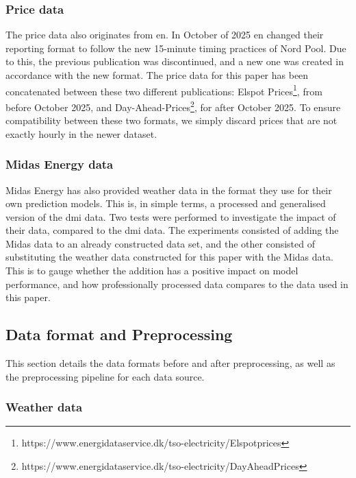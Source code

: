 \subsubsection{Price data}
The price data also originates from \gls{en}. In October of 2025 \gls{en} 
changed their reporting format to follow the new 15-minute timing practices of 
Nord Pool. Due to this, the previous publication was discontinued, and a new 
one 
was created in accordance with the new format. The price data for this paper 
has been concatenated between these two different publications: Elspot 
Prices\footnote{https://www.energidataservice.dk/tso-electricity/Elspotprices}, 
from before October 2025, and 
Day-Ahead-Prices\footnote{https://www.energidataservice.dk/tso-electricity/DayAheadPrices},
for after October 2025. To ensure compatibility between these two formats, we 
simply discard prices that are not exactly hourly in the newer dataset.

\subsubsection{Midas Energy data}
Midas Energy has also provided weather data in the format they use for their 
own prediction models. This is, in simple terms, a processed and generalised 
version of the \gls{dmi} data. Two tests were 
performed to investigate the 
impact of their data, compared to the \gls{dmi} data. The
experiments consisted of adding the Midas data to an already constructed data 
set, and the other consisted of substituting the weather data constructed for 
this paper with the Midas data.
This is to gauge whether the addition has a positive impact on model 
performance, and how professionally processed data compares to the data used in 
this paper.

\subsection{Data format and Preprocessing}
This section details the data formats before and after preprocessing, as well 
as the preprocessing pipeline for each data source.
\subsubsection{Weather data}

